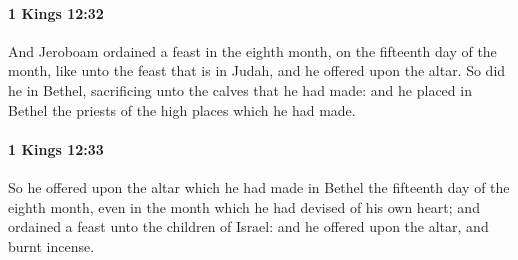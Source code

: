 		\paragraph{1 Kings 12:32} %
			\label{1KINGS-12-32}

			And Jeroboam ordained a feast in the eighth month, on the fifteenth day of the month, like unto the feast that is in Judah, and he offered upon the altar. So did he in Bethel, sacrificing unto the calves that he had made: and he placed in Bethel the priests of the high places which he had made.


		\paragraph{1 Kings 12:33} %
			\label{1KINGS-12-33}

			So he offered upon the altar which he had made in Bethel the fifteenth day of the eighth month, even in the month which he had devised of his own heart; and ordained a feast unto the children of Israel: and he offered upon the altar, and burnt incense.

